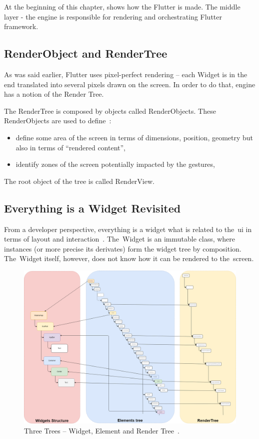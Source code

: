 At the beginning of this chapter,  shows how the Flutter is made. The middle layer - the engine is responsible for rendering and orchestrating Flutter framework. 
\subsection{RenderObject and RenderTree}
As was said earlier, Flutter uses pixel-perfect rendering -- each Widget is in the end translated into several pixels drawn on the screen. In order to do that, engine has a notion of the Render Tree.

The RenderTree is composed by objects called RenderObjects. These RenderObjects are used to define~\cite{didier-internals}:
\begin{itemize}
    \item define some area of the screen in terms of dimensions, position, geometry but also in terms of ``rendered content'',
    \item identify zones of the screen potentially impacted by the gestures,
\end{itemize}
The root object of the tree is called RenderView.
\subsection{Everything is a Widget Revisited}
From a developer perspective, everything is a widget what is related to the~\gls{ui} in terms of layout and interaction~\cite{didier-internals}. The~Widget is an immutable class, where instances (or more precise its derivates) form the widget tree by composition. The~Widget itself, however, does not know how it can be rendered to the~screen. 

\begin{figure}[ht]
    \centering
    \includegraphics[width=0.75\linewidth]{img/flutter/internals_3_trees.png}
    \caption{Three Trees -- Widget, Element and Render Tree~\cite{didier-internals}.}
    \label{fig:flutter-internal-3-trees}
\end{figure}

